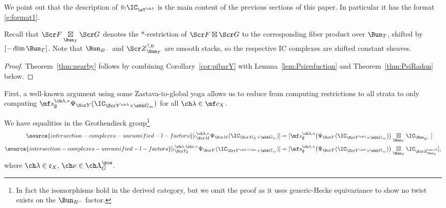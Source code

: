 We point out that the description of $\bar\pi_!\IC_{\sY^{\ch\lambda}}$ is
the main content of the previous sections of this paper. In particular it has the format \eqref{e:format1}.

Recall that $\Scr F\underset{\Bun_T}\boxtimes \Scr G$ denotes the $*$-restriction of
$\Scr F\boxtimes \Scr G$ to the corresponding fiber product over $\Bun_T$,
shifted by $[-\dim \Bun_T]$. Note that $\Bun_{B^-}$ and ${\Scr Z}^{?,0}_{\Bun_T}$ are smooth stacks, so the respective IC complexes are shifted constant sheaves.


\begin{proof}
Theorem~\ref{thm:nearby} follows by combining Corollary~\ref{cor:pibarY}
with Lemma~\ref{lem:Psireduction} and Theorem~\ref{thm:PsiRadon} below.
\end{proof}


First, a well-known argument using some Zastava-to-global yoga
allows us to reduce from computing restrictions to all strata to only
computing
$\mf s^{\ch\lambda,*}_\emptyset \Psi_{\Scr Y}(\IC_{\Scr Y^{\ch\lambda}\times\mbb G_m})$
for all $\ch\lambda\in \mf c_X$.

\begin{lem}
\notready \label{lem:Psireduction}
We have equalities in the Grothendieck group\footnote{In fact the isomorphisms hold in the derived category, but we omit the proof as it uses generic-Hecke equivariance to show no
twist exists on the $\Bun_{B^-}$ factor.}
\begin{align}
\label{e:YimpliesM}
\source{intersection-complexes-unramified-l-factors}
    [\iota^{\ch\lambda,*}_{\Scr M} \Psi_{\Scr M}(\IC_{\Scr M_X\times \mbb G_m})] &= [\mf s^{\ch\lambda,*}_\emptyset \bigl(\Psi_{\Scr Y}(\IC_{\Scr Y^{\ch\lambda}\times\mbb G_m})\bigr) \underset{\Bun_T}{\boxtimes} \IC_{\Bun_{B^-}}]  \\
\label{e:MimpliesY}
\source{intersection-complexes-unramified-l-factors}
    [\iota^{\ch\lambda,\ch\nu,*}_{\Scr Y_\emptyset} \Psi_{\Scr Y}(\IC_{\Scr Y^{\ch\lambda+\ch\nu} \times \mbb G_m})] &= [\mf s^{\ch\lambda,*}_\emptyset \bigl(\Psi_{\Scr Y}(\IC_{\Scr Y^{\ch\lambda} \times \mbb G_m}) \bigr) \underset{\Bun_T}\boxtimes \IC_{\Scr Z^{\ch\nu,0}_{\Bun_T}}],
\end{align}
where $\ch\lambda\in \mathfrak c_X, \,\ch\nu\in \ch\Lambda^\pos_G$.
\end{lem}

